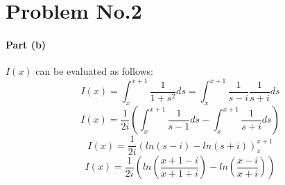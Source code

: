 \section*{Problem No.2} \label{sec:prob2}

\paragraph{Part (b)} 

$I(x)$ can be evaluated as follows:
\[
I(x) = \int_{x}^{x+1} \frac{1}{1+s^2} ds = \int_{x}^{x+1} \frac{1}{s-i} \frac{1}{s+i}ds
\]
$$
I(x) = \frac{1}{2i}  \left( \int_{x}^{x+1} \frac{1}{s-1} ds- \int_{x}^{x+1} \frac{1}{s+i} ds \right)
$$
$$
I(x) = \frac{1}{2i}  \left( ln(s-i) - ln(s+i) \right)_{x}^{x+1}
$$
$$
I(x) = \frac{1}{2i}  \left( ln\left(\frac{x+1-i}{x+1+i}\right) - ln\left(\frac{x-i}{x+i}\right)\right)
$$
